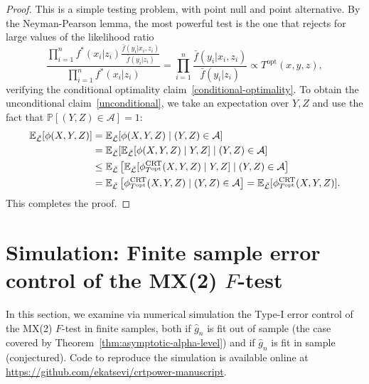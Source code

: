 \documentclass[12pt]{article}
\theoremstyle{definition}
\theoremstyle{remark}
\newcommand{\srx}{X}
\newcommand{\sfx}{x}
\newcommand{\srz}{Z}
\newcommand{\sfz}{z}
\newcommand{\sry}{Y}
\newcommand{\sfy}{y}
\def\CRT{\textnormal{CRT}}
\begin{document}
\begin{proof}
	This is a simple testing problem, with point null and point alternative. By the Neyman-Pearson lemma, the most powerful test is the one that rejects for large values of the likelihood ratio
	\begin{equation}
 \frac{\prod_{i = 1}^n f^*(\sfx_i|\sfz_i)\frac{\bar f(\sfy_i|\sfx_i, \sfz_i)}{\bar f(\sfy_i|\sfz_i)}}{\prod_{i = 1}^n f^*(\sfx_i|\sfz_i)} = \prod_{i = 1}^n \frac{\bar f(\sfy_i|\sfx_i, \sfz_i)}{\bar f(\sfy_i|\sfz_i)} \propto T^{\text{opt}}(\sfx, \sfy, \sfz),
	\label{eq:likelihood-ratio-derivation}
	\end{equation}
	verifying the conditional optimality claim~\eqref{conditional-optimality}. To obtain the unconditional claim~\eqref{unconditional}, we take an expectation over $\sry, \srz$ and use the fact that $\mathbb P[(\sry, \srz) \in \mathcal A] = 1$:
	\begin{equation}
		\begin{split}
			\mathbb E_{\bar{\mathcal L}}[\phi(\srx,\sry,\srz)] &= \mathbb E_{\bar{\mathcal L}}[\phi(\srx,\sry,\srz) \mid (\sry, \srz) \in \mathcal A] \\
			&= \mathbb E_{\bar{\mathcal L}}[\mathbb E_{\bar{\mathcal L}}[\phi(\srx,\sry,\srz) \mid \sry,\srz] \mid (\sry, \srz) \in \mathcal A] \\
			&\leq \mathbb E_{\bar{\mathcal L}}\left[\mathbb E_{\bar{\mathcal L}}[\phi^{\CRT}_{T^\textnormal{opt}}(\srx,\sry,\srz)\mid\sry,\srz] \mid (\sry, \srz) \in \mathcal A\right] \\
			&= \mathbb E_{\bar{\mathcal L}}\left[\phi^{\CRT}_{T^\textnormal{opt}}(\srx,\sry,\srz) \mid (\sry, \srz) \in \mathcal A\right] = \mathbb E_{\bar{\mathcal L}}[\phi^{\CRT}_{T^\textnormal{opt}}(\srx, \sry, \srz)].
		\end{split}	
	\end{equation}
This completes the proof.
\end{proof}

\section{Simulation: Finite sample error control of the MX(2) $F$-test}  \label{sec:simulations}

In this section, we examine via numerical simulation the Type-I error control of the MX(2) $F$-test in finite samples, both if $\widehat g_n$ is fit out of sample (the case covered by Theorem~\ref{thm:asymptotic-alpha-level}) and if $\widehat g_n$ is fit in sample (conjectured). Code to reproduce the simulation is available online at \url{https://github.com/ekatsevi/crtpower-manuscript}.
\end{document}
